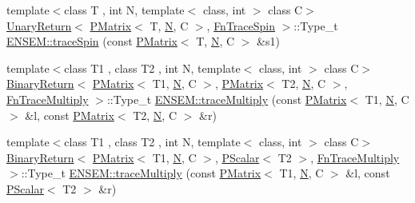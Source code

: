 \begin{DoxyCompactItemize}
\item 
{\footnotesize template$<$class T , int N, template$<$ class, int $>$ class C$>$ }\\\mbox{\hyperlink{structENSEM_1_1UnaryReturn}{Unary\+Return}}$<$ \mbox{\hyperlink{classENSEM_1_1PMatrix}{P\+Matrix}}$<$ T, \mbox{\hyperlink{operator__name__util_8cc_a7722c8ecbb62d99aee7ce68b1752f337}{N}}, C $>$, \mbox{\hyperlink{structENSEM_1_1FnTraceSpin}{Fn\+Trace\+Spin}} $>$\+::Type\+\_\+t \mbox{\hyperlink{group__primmatrix_gaaf91f3c1c18cadfc208acd80fd80ab0b}{E\+N\+S\+E\+M\+::trace\+Spin}} (const \mbox{\hyperlink{classENSEM_1_1PMatrix}{P\+Matrix}}$<$ T, \mbox{\hyperlink{operator__name__util_8cc_a7722c8ecbb62d99aee7ce68b1752f337}{N}}, C $>$ \&s1)
\item 
{\footnotesize template$<$class T1 , class T2 , int N, template$<$ class, int $>$ class C$>$ }\\\mbox{\hyperlink{structENSEM_1_1BinaryReturn}{Binary\+Return}}$<$ \mbox{\hyperlink{classENSEM_1_1PMatrix}{P\+Matrix}}$<$ T1, \mbox{\hyperlink{operator__name__util_8cc_a7722c8ecbb62d99aee7ce68b1752f337}{N}}, C $>$, \mbox{\hyperlink{classENSEM_1_1PMatrix}{P\+Matrix}}$<$ T2, \mbox{\hyperlink{operator__name__util_8cc_a7722c8ecbb62d99aee7ce68b1752f337}{N}}, C $>$, \mbox{\hyperlink{structENSEM_1_1FnTraceMultiply}{Fn\+Trace\+Multiply}} $>$\+::Type\+\_\+t \mbox{\hyperlink{group__primmatrix_ga91e09af0f8d2d70627950b973f6b41ec}{E\+N\+S\+E\+M\+::trace\+Multiply}} (const \mbox{\hyperlink{classENSEM_1_1PMatrix}{P\+Matrix}}$<$ T1, \mbox{\hyperlink{operator__name__util_8cc_a7722c8ecbb62d99aee7ce68b1752f337}{N}}, C $>$ \&l, const \mbox{\hyperlink{classENSEM_1_1PMatrix}{P\+Matrix}}$<$ T2, \mbox{\hyperlink{operator__name__util_8cc_a7722c8ecbb62d99aee7ce68b1752f337}{N}}, C $>$ \&r)
\item 
{\footnotesize template$<$class T1 , class T2 , int N, template$<$ class, int $>$ class C$>$ }\\\mbox{\hyperlink{structENSEM_1_1BinaryReturn}{Binary\+Return}}$<$ \mbox{\hyperlink{classENSEM_1_1PMatrix}{P\+Matrix}}$<$ T1, \mbox{\hyperlink{operator__name__util_8cc_a7722c8ecbb62d99aee7ce68b1752f337}{N}}, C $>$, \mbox{\hyperlink{classENSEM_1_1PScalar}{P\+Scalar}}$<$ T2 $>$, \mbox{\hyperlink{structENSEM_1_1FnTraceMultiply}{Fn\+Trace\+Multiply}} $>$\+::Type\+\_\+t \mbox{\hyperlink{group__primmatrix_gac4a39563bd9c9b587bd894f97f9e3fc4}{E\+N\+S\+E\+M\+::trace\+Multiply}} (const \mbox{\hyperlink{classENSEM_1_1PMatrix}{P\+Matrix}}$<$ T1, \mbox{\hyperlink{operator__name__util_8cc_a7722c8ecbb62d99aee7ce68b1752f337}{N}}, C $>$ \&l, const \mbox{\hyperlink{classENSEM_1_1PScalar}{P\+Scalar}}$<$ T2 $>$ \&r)

\end{DoxyCompactItemize}
